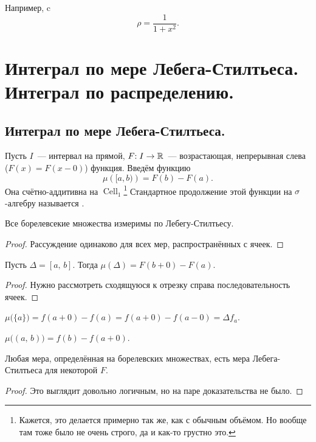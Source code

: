 \documentclass{notes}
\DeclareMathOperator{\Cell}{Cell}
\begin{document}
	\begin{exm}
		Например,  c 
		\[
			\rho = \dfrac{1}{1 + x^2}.
		\]
	\end{exm}

\section{Интеграл по мере Лебега-Стилтьеса. Интеграл по распределению.}
	
\subsection{Интеграл по мере Лебега-Стилтьеса.}
	\begin{de}
		Пусть $I$~--- интервал на прямой, $F \text{\text{:}} \; I \to \mathbb{R}$~--- возрастающая, непрерывная слева ($F(x) = F(x - 0)$) функция. Введём функцию
		\[
			\mu\left([a, b)\right) = F(b) - F(a).
		\]
		Она счётно-аддитивна на $\Cell_1$\footnote{Кажется, это делается примерно так же, как с обычным объёмом. Но вообще там тоже было не очень строго, да и как-то грустно это.} Стандартное продолжение этой функции на $\sigma$-алгебру называется .
	\end{de}

	\begin{st}
		Все борелевсекие множества измеримы по Лебегу-Стилтьесу.
		\begin{proof}
			Рассуждение одинаково для всех мер, распространённых с ячеек.
		\end{proof}
	\end{st}

	\begin{pr}
		Пусть $\Delta = [a, \, b]$. Тогда $\mu(\Delta) = F(b + 0) - F(a)$.
		\begin{proof}
			Нужно рассмотреть сходящуюся к отрезку справа последовательность ячеек.
		\end{proof}
	\end{pr}

	\begin{pr}
		$\mu\big(\{a\}\big) = f(a + 0) - f(a) = f(a + 0) - f(a - 0) = \Delta f_a$.
	\end{pr}

	\begin{pr}
		$\mu\big((a, \, b)\big) = f(b) - f(a + 0)$.
	\end{pr}

	\begin{st}
		Любая мера, определённая на борелевских множествах, есть мера Лебега-Стилтьеса для некоторой $F$.
		\begin{proof}
			Это выглядит довольно логичным, но на паре доказательства не было.
		\end{proof}
	\end{st}
\end{document}
